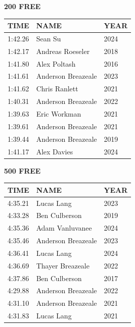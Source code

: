 \begin{table}[H]
\centering
\begin{minipage}[t]{0.48\textwidth}
\centering
\textbf{200 FREE}\\[0.1cm]
\begin{tabular}{@{}p{1.8cm}p{2.8cm}p{1.2cm}@{}}
\hline
    \textbf{TIME} & \textbf{NAME} & \textbf{YEAR} \\
\hline
    1:42.26 & Sean Su & 2024 \\
    1:42.17 & Andreas Roeseler & 2018 \\
    1:41.80 & Alex Poltash & 2016 \\
    1:41.61 & Anderson Breazeale & 2023 \\
    1:41.62 & Chris Ranlett & 2021 \\
    1:40.31 & Anderson Breazeale & 2022 \\
    1:39.63 & Eric Workman & 2021 \\
    1:39.61 & Anderson Breazeale & 2021 \\
    1:39.44 & Anderson Breazeale & 2019 \\
    1:41.17 & Alex Davies & 2024 \\
\hline
\end{tabular}
\end{minipage}\hfill
\begin{minipage}[t]{0.48\textwidth}
\centering
\textbf{500 FREE}\\[0.1cm]
\begin{tabular}{@{}p{1.8cm}p{2.8cm}p{1.2cm}@{}}
\hline
    \textbf{TIME} & \textbf{NAME} & \textbf{YEAR} \\
\hline
    4:35.21 & Lucas Lang & 2023 \\
    4:33.28 & Ben Culberson & 2019 \\
    4:35.36 & Adam Vanluvanee & 2024 \\
    4:35.46 & Anderson Breazeale & 2023 \\
    4:36.41 & Lucas Lang & 2024 \\
    4:36.69 & Thayer Breazeale & 2022 \\
    4:37.86 & Ben Culberson & 2017 \\
    4:29.88 & Anderson Breazeale & 2022 \\
    4:31.10 & Anderson Breazeale & 2021 \\
    4:31.83 & Lucas Lang & 2021 \\
\hline
\end{tabular}
\end{minipage}
\end{table}


